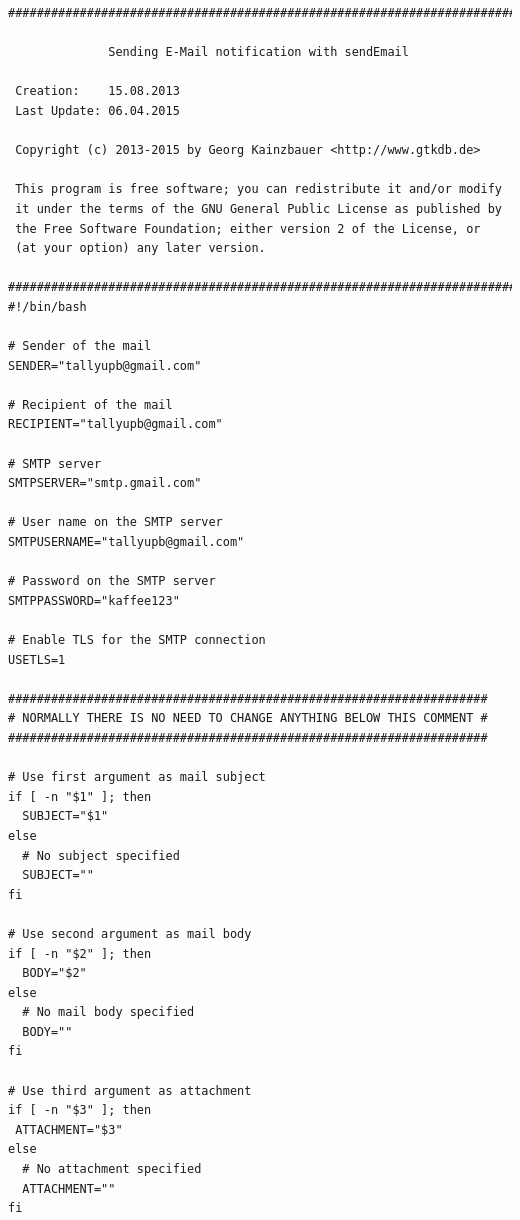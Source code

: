 \documentclass[11pt,a4paper]{article} %
\begin{document}
\begin{frame}

\begin{lstlisting}
###########################################################################
                                                                   
              Sending E-Mail notification with sendEmail               
                                                                       
 Creation:    15.08.2013                                              
 Last Update: 06.04.2015                                               
 
 Copyright (c) 2013-2015 by Georg Kainzbauer <http://www.gtkdb.de>     
                                                                       
 This program is free software; you can redistribute it and/or modify  
 it under the terms of the GNU General Public License as published by  
 the Free Software Foundation; either version 2 of the License, or     
 (at your option) any later version.                                   
                                                                       
###########################################################################
#!/bin/bash

# Sender of the mail
SENDER="tallyupb@gmail.com"

# Recipient of the mail
RECIPIENT="tallyupb@gmail.com"

# SMTP server
SMTPSERVER="smtp.gmail.com"

# User name on the SMTP server
SMTPUSERNAME="tallyupb@gmail.com"

# Password on the SMTP server
SMTPPASSWORD="kaffee123"

# Enable TLS for the SMTP connection
USETLS=1

###################################################################
# NORMALLY THERE IS NO NEED TO CHANGE ANYTHING BELOW THIS COMMENT #
###################################################################

# Use first argument as mail subject
if [ -n "$1" ]; then
  SUBJECT="$1"
else
  # No subject specified
  SUBJECT=""
fi

# Use second argument as mail body
if [ -n "$2" ]; then
  BODY="$2"
else
  # No mail body specified
  BODY=""
fi

# Use third argument as attachment
if [ -n "$3" ]; then
 ATTACHMENT="$3"
else
  # No attachment specified
  ATTACHMENT=""
fi


\end{lstlisting}
\end{frame}
\end{document}
